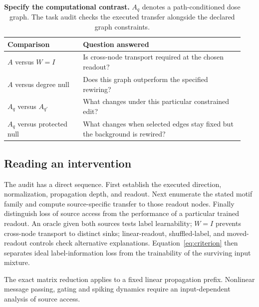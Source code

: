 \begin{table}[t]
\centering
\caption{\textbf{Specify the computational contrast.} $A_q$ denotes a
path-conditioned dose graph. The task audit checks the executed transfer
alongside the declared graph constraints.}
\label{tab:questions}
\small
\begin{tabular}{@{}p{0.30\linewidth}p{0.64\linewidth}@{}}
\toprule
Comparison & Question answered \\
\midrule
$A$ versus $W=I$ & Is cross-node transport required at the chosen readout? \\[3pt]
$A$ versus degree null & Does this graph outperform the specified rewiring? \\[3pt]
$A_q$ versus $A_{q'}$ & What changes under this particular constrained edit? \\[3pt]
$A_q$ versus protected null & What changes when selected edges stay fixed but the background is rewired? \\
\bottomrule
\end{tabular}
\end{table}

\subsection{Reading an intervention}
\label{sec:controls}

The audit has a direct sequence. First establish the executed direction,
normalization, propagation depth, and readout. Next enumerate the stated
motif family and compute source-specific transfer to those readout nodes.
Finally distinguish loss of source access from the performance of a
particular trained readout. An oracle given both sources tests label
learnability; $W=I$ prevents cross-node transport to distinct sinks;
linear-readout, shuffled-label, and moved-readout controls check alternative
explanations. Equation~\eqref{eq:criterion} then separates ideal label-information
loss from the trainability of the surviving input mixture.

The exact matrix reduction applies to a fixed linear propagation prefix.
Nonlinear message passing, gating and spiking dynamics require an
input-dependent analysis of source access.
